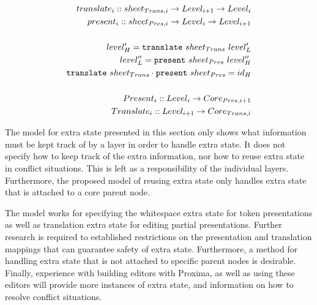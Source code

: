 \begin{small}\begin{align*}%
translate_{i} :: sheet_{Trans,i} \rightarrow Level_{i+1} \rightarrow Level_{i}\\
present_{i} :: sheet_{Pres,i}  \rightarrow  Level_{i} \rightarrow Level_{i+1}\\
\\
level'_{H} = {\tt translate}~sheet_{Trans}~level'_{L}\\
level''_{L} = {\tt present}~sheet_{Pres}~level''_{H}\\
{\tt translate}~sheet_{Trans}  \cdot {\tt present}~sheet_{Pres} = id_{H}\\
\\
Present_{i} :: Level_{i} \rightarrow Core_{Pres,i+1}\\
Translate_{i} :: Level_{i+1} \rightarrow Core_{Trans,i}\\
\end{align*} 
\end{small}
\center{()}
\ec


The model for extra state presented in this section only shows what information must be kept track of by a layer in order to handle extra state. It does not specify how to keep track of the extra information, nor how to reuse extra state in conflict situations. This is left as a responsibility of the individual layers. Furthermore, the proposed model of reusing extra state only handles extra state that is attached to a core parent node.  

The model works for specifying the whitespace extra state for token presentations as well as translation extra state for editing partial presentations. Further research is required to established restrictions on the presentation and translation mappings that can guarantee safety of extra state. Furthermore, a method for handling extra state that is not attached to specific parent nodes is desirable.  Finally, experience with building editors with Proxima, as well as using these editors will provide more instances of extra state, and information on how to resolve conflict situations.

